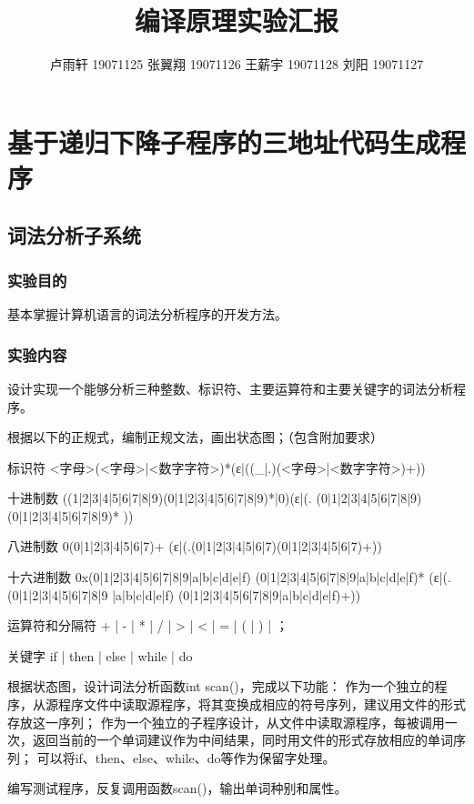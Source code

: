 \documentclass{ctexrep}
\title{编译原理实验汇报}
\author{卢雨轩 19071125 张翼翔 19071126 王薪宇 19071128 刘阳 19071127}
\begin{document}
\maketitle

\tableofcontents


\ttfamily
\songti

\chapter{基于递归下降子程序的三地址代码生成程序}
\section{词法分析子系统}
\subsection{实验目的}
基本掌握计算机语言的词法分析程序的开发方法。
\subsection{实验内容}
设计实现一个能够分析三种整数、标识符、主要运算符和主要关键字的词法分析程序。

\begin{outline}[enumerate]
    \1 根据以下的正规式，编制正规文法，画出状态图；（包含附加要求）

    标识符	 <字母>(<字母>|<数字字符>)*(ε|((\_|.)(<字母>|<数字字符>)+))

    十进制数 ((1|2|3|4|5|6|7|8|9)(0|1|2|3|4|5|6|7|8|9)*|0)(ε|(. (0|1|2|3|4|5|6|7|8|9) (0|1|2|3|4|5|6|7|8|9)* ))

    八进制数 0(0|1|2|3|4|5|6|7)+ (ε|(.(0|1|2|3|4|5|6|7)(0|1|2|3|4|5|6|7)+))

    十六进制数  0x(0|1|2|3|4|5|6|7|8|9|a|b|c|d|e|f) (0|1|2|3|4|5|6|7|8|9|a|b|c|d|e|f)* (ε|(. (0|1|2|3|4|5|6|7|8|9 |a|b|c|d|e|f) (0|1|2|3|4|5|6|7|8|9|a|b|c|d|e|f)+))

    运算符和分隔符	+ | - | * | / | > | < | = | ( | ) | ；

    关键字			if | then | else | while | do
    
    \1 根据状态图，设计词法分析函数int scan()，完成以下功能：
        \2 作为一个独立的程序，从源程序文件中读取源程序，将其变换成相应的符号序列，建议用文件的形式存放这一序列；
        \2 作为一个独立的子程序设计，从文件中读取源程序，每被调用一次，返回当前的一个单词建议作为中间结果，同时用文件的形式存放相应的单词序列；
        \2 可以将if、then、else、while、do等作为保留字处理。
    
    \1 编写测试程序，反复调用函数scan()，输出单词种别和属性。
\end{outline}
\end{document}
